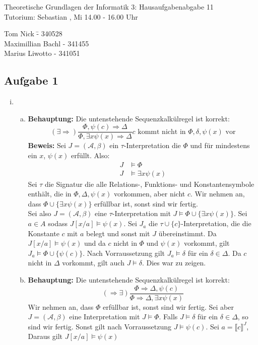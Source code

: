 \documentclass[a4paper,10pt]{article}
\begin{document}
\begin{center}
\Large{Theoretische Grundlagen der Informatik 3: Hausaufgabenabgabe 11} \\
\large{Tutorium: Sebastian , Mi 14.00 - 16.00 Uhr}
\end{center}
\begin{tabbing}
Tom Nick \hspace{2cm}\= - 340528\\
Maximillian Bachl \> - 341455 \\
Marius Liwotto\> -  341051
\end{tabbing}
\subsection*{Aufgabe 1}
\begin{enumerate}[(i)]
	\item
	\begin{enumerate}[a)]
	
		\item \textbf{Behauptung: } Die untenstehende Sequenzkalkülregel ist korrekt:
		\[ (\exists \Rightarrow) \frac{\Phi, \psi(c) \Rightarrow \Delta}{\Phi, \exists x \psi(x)\Rightarrow \Delta} c \text{ kommt nicht in $\Phi,\delta,\psi(x)$ vor}\]
		\textbf{Beweis:} 
		Sei $J = (\mathcal{A},\beta)$ ein $\tau$-Interpretation die $\Phi$ und für mindestens ein $x$, $\psi(x)$ erfüllt. Also:
		\begin{align*}
			J &\vDash \Phi \\
			J &\vDash \exists x \psi(x)
		\end{align*}
		Sei $\tau$ die Signatur die alle Relations-, Funktions- und Konstantensymbole enthält, die in $\Phi, \Delta, \psi(x)$ vorkommen, aber nicht $c$.
		Wir nehmen an, dass $\Phi \cup \{ \exists x \psi(x)\}$ erfüllbar ist, sonst sind wir fertig. \\
		Sei also $J = (\mathcal{A}, \beta)$ eine $\tau$-Interpretation mit $J \vDash \Phi \cup \{\exists x\psi(x) \}$. 
		Sei $a \in A$ sodass $J[x/a] \vDash \psi(x)$. Sei $J_a$ die $\tau \cup \{c\}$-Interpretation, die die Konstante $c$ mit $a$ belegt und
		sonst mit $J$ übereinstimmt. Da $J[x/a] \vDash \psi(x)$ und da $c$ nicht in $\Phi$ und $\psi(x)$ vorkommt, gilt $J_a \vDash \Phi \cup \{\psi(c)\}$.
		Nach Vorraussetzung gilt $J_a \vDash \delta$ für ein $\delta \in \Delta$. Da $c$ nicht in $\Delta$ vorkommt, gilt auch $J \vDash \delta$. Dies war zu zeigen.
		\item \textbf{Behauptung: } Die untenstehende Sequenzkalkülregel ist korrekt:
		\[  ( \Rightarrow \exists ) \frac{\Phi \Rightarrow \Delta, \psi(c)}{\Phi\Rightarrow \Delta, \exists x \psi(x)} \]
		Wir nehmen an, dass $\Phi$ erfüllbar ist, sonst sind wir fertig. Sei aber $J = (\mathcal{A}, \beta)$ eine Interpretation mit $J \vDash \Phi$. 
		Falls $J \vDash \delta$ für ein $\delta \in \Delta$, so sind wir fertig. Sonst gilt nach Vorraussetzung $J \vDash \psi(c)$. Sei $a = \llbracket c \rrbracket^J$,
		Daraus gilt $J[x/a] \vDash \psi(x)$
	\end{enumerate}
\end{enumerate}
\end{document}
